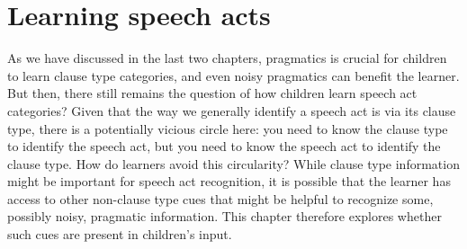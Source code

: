 \chapter{Learning speech acts}
\label{chap:eng-sp}

As we have discussed in the last two chapters, pragmatics is crucial for children to learn clause type categories, and even noisy pragmatics can benefit the learner. But then, there still remains the question of how children learn speech act categories? Given that the way we generally identify a speech act is via its clause type, there is a potentially vicious circle here: you need to know the clause type to identify the speech act, but you need to know the speech act to identify the clause type. How do learners avoid this circularity? While clause type information might be important for speech act recognition, it is possible that the learner has access to other non-clause type cues that might be helpful to recognize some, possibly noisy, pragmatic information. This chapter therefore explores whether such cues are present in children's input. %



